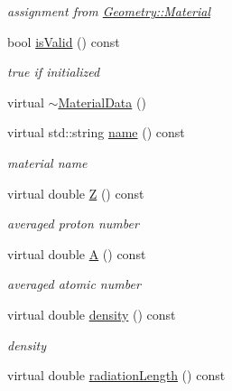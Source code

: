 \begin{DoxyCompactItemize}
\begin{DoxyCompactList}\small\item\em assignment from \hyperlink{class_d_d4hep_1_1_geometry_1_1_material}{Geometry::Material} \item\end{DoxyCompactList}\item 
bool \hyperlink{class_d_d4hep_1_1_d_d_rec_1_1_material_data_a27c7d3f8451ecdfc4bb906eba53a0c8a}{isValid} () const 
\begin{DoxyCompactList}\small\item\em true if initialized \item\end{DoxyCompactList}\item 
virtual \hyperlink{class_d_d4hep_1_1_d_d_rec_1_1_material_data_af8e5c9f475adfaef01379519c9e92929}{$\sim$MaterialData} ()
\item 
virtual std::string \hyperlink{class_d_d4hep_1_1_d_d_rec_1_1_material_data_ac9e726288ae5d247dd007264a6ab906c}{name} () const 
\begin{DoxyCompactList}\small\item\em material name \item\end{DoxyCompactList}\item 
virtual double \hyperlink{class_d_d4hep_1_1_d_d_rec_1_1_material_data_a88319ef5ac7fe45c92bcd76bcd863abc}{Z} () const 
\begin{DoxyCompactList}\small\item\em averaged proton number \item\end{DoxyCompactList}\item 
virtual double \hyperlink{class_d_d4hep_1_1_d_d_rec_1_1_material_data_a742efa66c52faa0f1c1f578ccef2aa61}{A} () const 
\begin{DoxyCompactList}\small\item\em averaged atomic number \item\end{DoxyCompactList}\item 
virtual double \hyperlink{class_d_d4hep_1_1_d_d_rec_1_1_material_data_a19e29eb0fbddd4c152c3ebfe5843fddb}{density} () const 
\begin{DoxyCompactList}\small\item\em density \item\end{DoxyCompactList}\item 
virtual double \hyperlink{class_d_d4hep_1_1_d_d_rec_1_1_material_data_a75a9b15822c405e501758aa134806353}{radiationLength} () const 

\end{DoxyCompactItemize}
